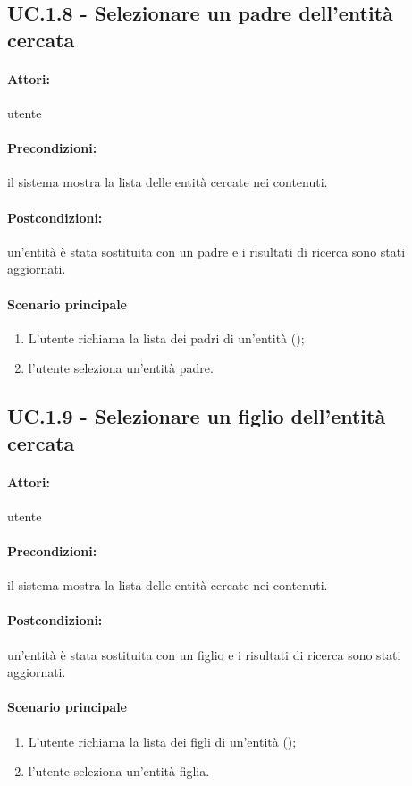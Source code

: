 \documentclass[10pt,a4paper,headinclude,footinclude,hidelinks]{scrreprt} %
\begin{document}
	\subsection[UC.1.8]{UC.1.8 - Selezionare un padre dell'entità cercata}
	\label{ch:stage:ar:uc:1_8}
	\paragraph{Attori:} utente
	\paragraph{Precondizioni:} il sistema mostra la lista delle entità cercate nei contenuti.
	\paragraph{Postcondizioni:} un'entità è stata sostituita con un padre e i risultati di ricerca sono stati aggiornati.
	\paragraph{Scenario principale}
	\begin{enumerate}
	\item L'utente richiama la lista dei padri di un'entità ();
	\item l'utente seleziona un'entità padre.
	\end{enumerate}

	\subsection[UC.1.9]{UC.1.9 - Selezionare un figlio dell'entità cercata}
	\label{ch:stage:ar:uc:1_9}
	\paragraph{Attori:} utente
	\paragraph{Precondizioni:} il sistema mostra la lista delle entità cercate nei contenuti.
	\paragraph{Postcondizioni:} un'entità è stata sostituita con un figlio e i risultati di ricerca sono stati aggiornati.
	\paragraph{Scenario principale}
	\begin{enumerate}
	\item L'utente richiama la lista dei figli di un'entità ();
	\item l'utente seleziona un'entità figlia.
	\end{enumerate}
\end{document}
